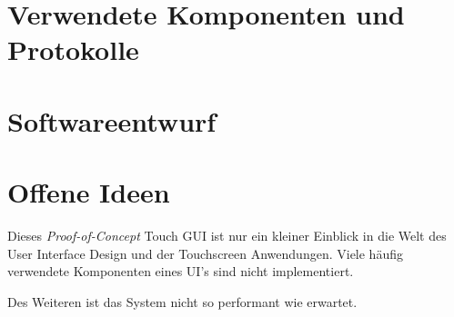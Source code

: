 \documentclass[a4paper,singleside,12pt,titlepage]{scrartcl}
\begin{document}
	\section{Verwendete Komponenten und Protokolle}
	
	
	
	
	\newpage
	\section{Softwareentwurf}
	
	
	\section{Offene Ideen}
		Dieses \emph{Proof-of-Concept} Touch GUI ist nur ein kleiner Einblick in die Welt des User Interface Design und der Touchscreen Anwendungen.
		Viele häufig verwendete Komponenten eines UI's sind nicht implementiert.
		
		Des Weiteren ist das System nicht so performant wie erwartet.
	
	\newpage
	\printbibliography[heading=bibnumbered]
\end{document}
